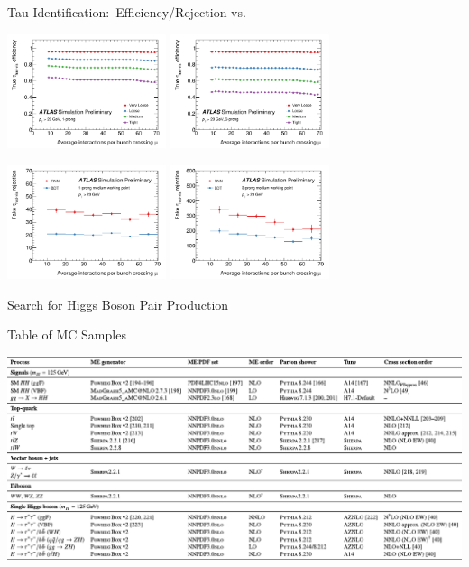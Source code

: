 \documentclass[11pt, xcolor={dvipsnames}, aspectratio=169, notes]{beamer}
\begin{document}
\begin{frame}{Tau Identification:\ Efficiency/Rejection vs.\ \allbold{$\mu$}}
  \centering

  \includegraphics[width=0.35\textwidth]{tauid/pubnote/eff_vs_mu_1p}%
  \includegraphics[width=0.35\textwidth]{tauid/pubnote/eff_vs_mu_3p}%

  \includegraphics[width=0.35\textwidth]{tauid/pubnote/rej_vs_mu_1p}%
  \includegraphics[width=0.35\textwidth]{tauid/pubnote/rej_vs_mu_3p}%
\end{frame}


\begin{frame}[standout]
  Search for Higgs Boson Pair Production
\end{frame}


\begin{frame}{Table of MC Samples}
  \centering

  \includegraphics[width=1.\textwidth]{backup/mc_table}
\end{frame}
\end{document}
